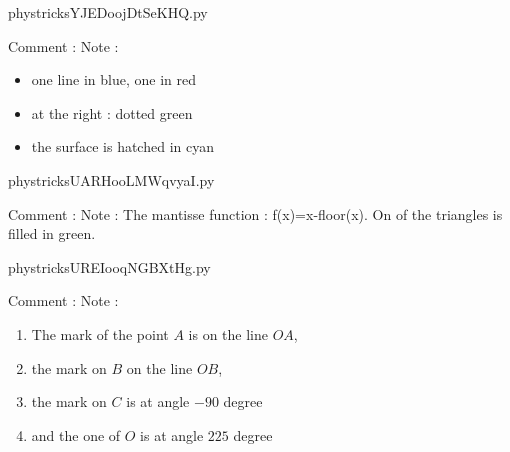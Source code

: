 



    \newcommand{\CaptionFigYJEDoojDtSeKHQ}{<+Type your caption here+>}
    \begin{center}
        
    \end{center}
    phystricksYJEDoojDtSeKHQ.py

    Comment : Note : \begin{itemize}
    \item one line in blue, one in red
    \item at the right : dotted green 
    \item the surface is hatched in cyan
    \end{itemize}
    

    \clearpage
    


    \newcommand{\CaptionFigUARHooLMWqvyaI}{<+Type your caption here+>}
    \begin{center}
        
    \end{center}
    phystricksUARHooLMWqvyaI.py

    Comment : Note : The mantisse function : f(x)=x-floor(x).  On of the triangles is filled in green.

    \clearpage
    


    \newcommand{\CaptionFigUREIooqNGBXtHg}{<+Type your caption here+>}
    \begin{center}
        
    \end{center}
    phystricksUREIooqNGBXtHg.py

    Comment : Note : 
    \begin{enumerate}
    \item
    The mark of the point \( A\)  is on the line \( OA\),
    \item
    the mark on $B$ on the line $OB$, 
    \item
    the mark on $C$ is at angle $-90$ degree
    \item
    and the one of \( O\) is at angle \( 225\) degree
    \end{enumerate}
    

    \clearpage
    


